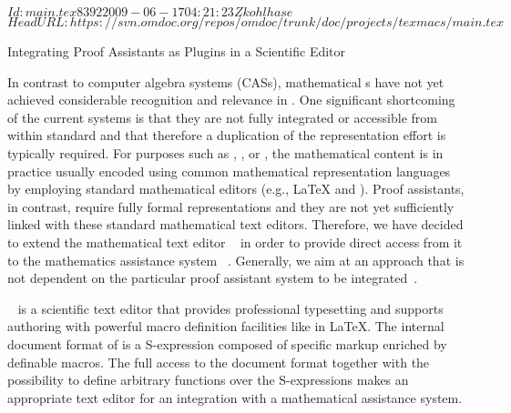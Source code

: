 \svnInfo $Id: main.tex 8392 2009-06-17 04:21:23Z kohlhase $
\svnKeyword $HeadURL: https://svn.omdoc.org/repos/omdoc/trunk/doc/projects/texmacs/main.tex $

\begin{omgroup}[id=texmacs-omega,short=Proof Assistants in Scientific Editors,
  creators={autexier,benzmueller,fiedler,lesourd}]
    {Integrating Proof Assistants as Plugins  in a Scientific Editor}


In contrast to computer algebra systems (CASs), mathematical {s} have not yet achieved considerable recognition and relevance in
{}.  One significant shortcoming of the current systems is
that they are not fully integrated or accessible from within standard
{} and that therefore a duplication of the
representation effort is typically required. For purposes such as {},
{}, or {}, the mathematical content is in
practice usually encoded using common mathematical representation languages by employing
standard mathematical editors (e.g., {\LaTeX} and {\emacs}). Proof assistants, in
contrast, require fully formal representations and they are not yet sufficiently linked
with these standard mathematical text editors.  Therefore, we have decided to extend the
mathematical text editor {\texmacs}~\cite{VdH01} in order to provide direct access from it
to the mathematics assistance system {\OMEGA}~\cite{OMEGA02,SBA-05-a}. Generally, we aim
at an approach that is not dependent on the particular proof assistant system to be
integrated~\cite{ABFL-05-a}.

{\texmacs}~\cite{VdH01} is a scientific {} text editor that provides
professional typesetting and supports authoring with powerful macro definition facilities
like in {\LaTeX}. The internal document format of {\texmacs} is a {}
S-expression composed of {\texmacs} specific markup enriched by definable macros.  The
full access to the document format together with the possibility to define arbitrary
{} functions over the S-expressions makes {\texmacs} an appropriate text
editor for an integration with a mathematical assistance system.


\end{omgroup}

